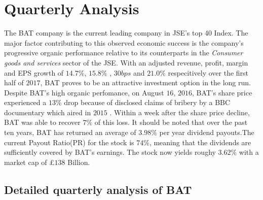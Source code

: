 \documentclass[letterpaper, 10 pt, conference]{ieeeconf}  %
\begin{document}
 
 \section{ Quarterly Analysis}	
 	The BAT company is the current leading company in JSE's top 40 Index. The major factor contributing to this observed economic success is the company's progressive organic performance relative to its counterparts in the \textit{Consumer goods and services} sector of the JSE.  With  an adjusted revenue, profit, margin and EPS growth of $14.7\%$, $15.8\%$ , $30 bps$ and $21.0\%$ respecitively over the first half of $2017$, BAT proves to be an attractive investment option in the long run\cite{interimResults}. Despite BAT's high organic perfomance, on August $16$, $2016$, BAT's share price experienced a $13\%$ drop because of disclosed claims of bribery by a BBC documentary which aired in $2015$ \cite{Jonathan_Weber}. Within a week after the share price decline,  BAT was able to recover $7\%$ of this loss\cite{interimResults}.  
 	It should be noted that over the past ten years, BAT has returned an average of $3.98\%$ per year dividend payouts.The current Payout Ratio(PR) for the stock is $74\%$, meaning that the dividends are sufficiently covered by BAT's earnings. The stock now yields roughy $3.62\%$ with a market cap of \pounds $138$ Billion\cite{BAT_partOfYourPort}. 
 	
\subsection*{Detailed quarterly analysis of BAT}
\end{document}
